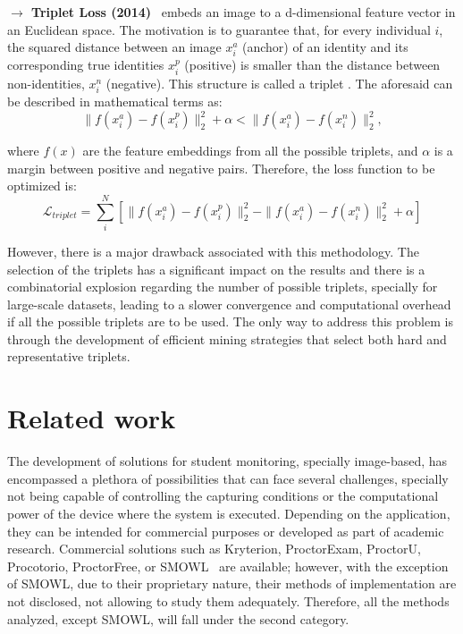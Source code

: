 \documentclass[class=report, crop=false, a4paper, 12pt]{standalone}
\begin{document}
\vspace{0.7\baselineskip}
\noindent\textbf{$\rightarrow$ Triplet Loss (2014)}~\autocite{schroffFaceNetUnifiedEmbedding2015} embeds an image to a d-dimensional feature vector in an Euclidean space. The motivation is to guarantee that, for every individual $i$, the squared distance between an image $x^{a}_{i}$ (anchor) of an identity and its corresponding true identities $x^{p}_{i}$ (positive) is smaller than the distance between non-identities, $x^{n}_{i}$ (negative). This structure is called a triplet . The aforesaid can be described in mathematical terms as:
\begin{equation}
\|f(x^{a}_{i})-f(x^{p}_{i})\|^{2}_{2} + \alpha < \|f(x^{a}_{i})-f(x^{n}_{i})\|^{2}_{2},
\end{equation}

\noindent where $f(x)$ are the feature embeddings from all the possible triplets, and $\alpha$ is a margin between positive and negative pairs. Therefore, the loss function to be optimized is:
\begin{equation}
\mathcal{L}_{triplet} = \sum_{i}^{N}\left[\|f(x^{a}_{i})-f(x^{p}_{i})\|^{2}_{2}-\|f(x^{a}_{i})-f(x^{n}_{i})\|^{2}_{2}+\alpha\right]
\end{equation}

\par However, there is a major drawback associated with this methodology. The selection of the triplets has a significant impact on the results and there is a combinatorial explosion regarding the number of possible triplets, specially for large-scale datasets, leading to a slower convergence and computational overhead if all the possible triplets are to be used. The only way to address this problem is through the development of efficient mining strategies that select both hard and representative triplets.

\section{Related work}
\label{sec:related_work}
The development of solutions for student monitoring, specially image-based, has encompassed a plethora of possibilities that can face several challenges, specially not being capable of controlling the capturing conditions or the computational power of the device where the system is executed. Depending on the application, they can be intended for commercial purposes or developed as part of academic research. Commercial solutions such as Kryterion, ProctorExam, ProctorU, Procotorio, ProctorFree, or SMOWL~\autocite{portugalContinuousUserIdentification2023} are available; however, with the exception of SMOWL, due to their proprietary nature, their methods of implementation are not disclosed, not allowing to study them adequately. Therefore, all the methods analyzed, except SMOWL, will fall under the second category.
\end{document}
